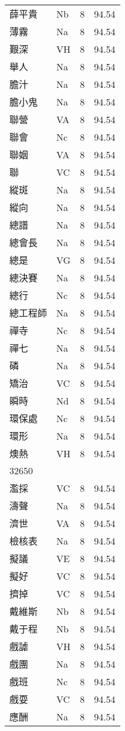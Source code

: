 \documentclass[twocolumn]{book}
\begin{document}
\begin{supertabular}{llrr}
薛平貴 & Nb & 8 &  94.54\\
薄霧 & Na & 8 &  94.54\\
艱深 & VH & 8 &  94.54\\
舉人 & Na & 8 &  94.54\\
膽汁 & Na & 8 &  94.54\\
膽小鬼 & Na & 8 &  94.54\\
聯營 & VA & 8 &  94.54\\
聯會 & Nc & 8 &  94.54\\
聯姻 & VA & 8 &  94.54\\
聯 & VC & 8 &  94.54\\
縱斑 & Na & 8 &  94.54\\
縱向 & Na & 8 &  94.54\\
總譜 & Na & 8 &  94.54\\
總會長 & Na & 8 &  94.54\\
總是 & VG & 8 &  94.54\\
總決賽 & Na & 8 &  94.54\\
總行 & Nc & 8 &  94.54\\
總工程師 & Na & 8 &  94.54\\
禪寺 & Nc & 8 &  94.54\\
禪七 & Na & 8 &  94.54\\
磷 & Na & 8 &  94.54\\
矯治 & VC & 8 &  94.54\\
瞬時 & Nd & 8 &  94.54\\
環保處 & Nc & 8 &  94.54\\
環形 & Na & 8 &  94.54\\
燠熱 & VH & 8 &  94.54\\
32650\\
濫採 & VC & 8 &  94.54\\
濤聲 & Na & 8 &  94.54\\
濟世 & VA & 8 &  94.54\\
檢核表 & Na & 8 &  94.54\\
擬議 & VE & 8 &  94.54\\
擬好 & VC & 8 &  94.54\\
擠掉 & VC & 8 &  94.54\\
戴維斯 & Nb & 8 &  94.54\\
戴于程 & Nb & 8 &  94.54\\
戲謔 & VH & 8 &  94.54\\
戲團 & Na & 8 &  94.54\\
戲班 & Nc & 8 &  94.54\\
戲耍 & VC & 8 &  94.54\\
應酬 & Na & 8 &  94.54\\

\end{supertabular}
\end{document}
